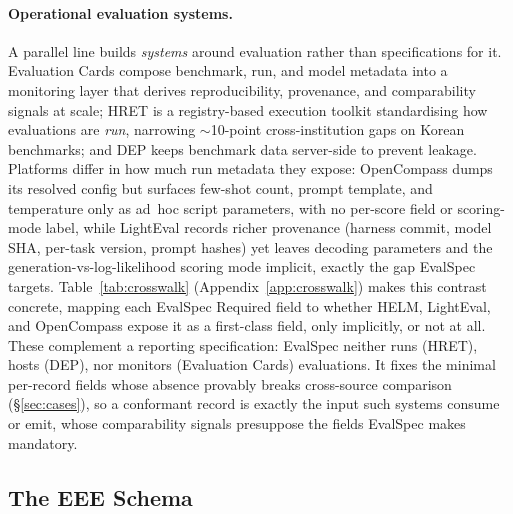 \documentclass[11pt]{article}
\begin{document}
\paragraph{Operational evaluation systems.} A parallel line builds \emph{systems}
around evaluation rather than specifications for it. Evaluation Cards
\citep{ghosh2026evalcards} compose benchmark, run, and model metadata into a
monitoring layer that derives reproducibility, provenance, and comparability signals
at scale; HRET \citep{lee2025hret} is a registry-based execution toolkit
standardising how evaluations are \emph{run}, narrowing $\sim$10-point
cross-institution gaps on Korean benchmarks; and DEP \citep{peng2026dep} keeps
benchmark data server-side to prevent leakage. Platforms differ in how much run metadata they expose: OpenCompass
\citep{opencompass2023} dumps its resolved config but surfaces few-shot count, prompt
template, and temperature only as ad~hoc script parameters, with no per-score field or
scoring-mode label, while LightEval \citep{lighteval} records richer provenance
(harness commit, model SHA, per-task version, prompt hashes) yet leaves decoding
parameters and the generation-vs-log-likelihood scoring mode implicit, exactly the
gap EvalSpec targets. Table~\ref{tab:crosswalk} (Appendix~\ref{app:crosswalk}) makes
this contrast concrete, mapping each EvalSpec Required field to whether HELM,
LightEval, and OpenCompass expose it as a first-class field, only implicitly, or not
at all.
These complement a reporting specification: EvalSpec neither runs (HRET), hosts
(DEP), nor monitors (Evaluation Cards) evaluations. It fixes the minimal per-record
fields whose absence provably breaks cross-source comparison (\S\ref{sec:cases}), so
a conformant record is exactly the input such systems consume or emit, whose
comparability signals presuppose the fields EvalSpec makes mandatory.


\subsection{The EEE Schema}
\end{document}
